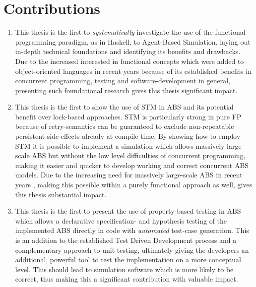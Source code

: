 \section{Contributions}
\begin{enumerate}
	\item This thesis is the first to \textit{systematically} investigate the use of the functional programming paradigm, as in Haskell, to Agent-Based Simulation, laying out in-depth technical foundations and identifying its benefits and drawbacks. Due to the increased interested in functional concepts which were added to object-oriented languages in recent years because of its established benefits in concurrent programming, testing and software-development in general, presenting such foundational research gives this thesis significant impact.
	
	
	\item This thesis is the first to show the use of STM in ABS and its potential benefit over lock-based approaches. STM is particularly strong in pure FP because of retry-semantics can be guaranteed to exclude non-repeatable persistent side-effects already at compile time. By showing how to employ STM it is possible to implement a simulation which allows massively large-scale ABS but without the low level difficulties of concurrent programming, making it easier and quicker to develop working and correct concurrent ABS models. Due to the increasing need for massively large-scale ABS in recent years \cite{lysenko_framework_2008}, making this possible within a purely functional approach as well, gives this thesis substantial impact.
	
	\item This thesis is the first to present the use of property-based testing in ABS which allows a declarative specification- and hypothesis testing of the implemented ABS directly in code with \textit{automated} test-case generation. This is an addition to the established Test Driven Development process and a complementary approach to unit-testing, ultimately giving the developers an additional, powerful tool to test the implementation on a more conceptual level. This should lead to simulation software which is more likely to be correct, thus making this a significant contribution with valuable impact.


\end{enumerate}
